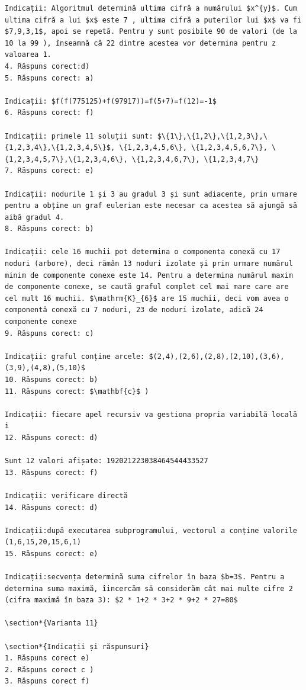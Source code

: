 \documentclass[10pt]{article}
\begin{document}
\begin{verbatim}
Indicații: Algoritmul determină ultima cifră a numărului $x^{y}$. Cum ultima cifră a lui $x$ este 7 , ultima cifră a puterilor lui $x$ va fi $7,9,3,1$, apoi se repetă. Pentru y sunt posibile 90 de valori (de la 10 la 99 ), înseamnă că 22 dintre acestea vor determina pentru z valoarea 1.
4. Răspuns corect:d)
5. Răspuns corect: a)

Indicații: $f(f(775125)+f(97917))=f(5+7)=f(12)=-1$
6. Răspuns corect: f)

Indicații: primele 11 soluții sunt: $\{1\},\{1,2\},\{1,2,3\},\{1,2,3,4\},\{1,2,3,4,5\}$, \{1,2,3,4,5,6\}, \{1,2,3,4,5,6,7\}, \{1,2,3,4,5,7\},\{1,2,3,4,6\}, \{1,2,3,4,6,7\}, \{1,2,3,4,7\}
7. Răspuns corect: e)

Indicații: nodurile 1 și 3 au gradul 3 și sunt adiacente, prin urmare pentru a obține un graf eulerian este necesar ca acestea să ajungă să aibă gradul 4.
8. Răspuns corect: b)

Indicații: cele 16 muchii pot determina o componenta conexă cu 17 noduri (arbore), deci rămân 13 noduri izolate și prin urmare numărul minim de componente conexe este 14. Pentru a determina numărul maxim de componente conexe, se caută graful complet cel mai mare care are cel mult 16 muchii. $\mathrm{K}_{6}$ are 15 muchii, deci vom avea o componentă conexă cu 7 noduri, 23 de noduri izolate, adică 24 componente conexe
9. Răspuns corect: c)

Indicații: graful conține arcele: $(2,4),(2,6),(2,8),(2,10),(3,6),(3,9),(4,8),(5,10)$
10. Răspuns corect: b)
11. Răspuns corect: $\mathbf{c}$ )

Indicații: fiecare apel recursiv va gestiona propria variabilă locală i
12. Răspuns corect: d)

Sunt 12 valori afișate: 192021223038464544433527
13. Răspuns corect: f)

Indicații: verificare directă
14. Răspuns corect: d)

Indicații:după executarea subprogramului, vectorul a conține valorile (1,6,15,20,15,6,1)
15. Răspuns corect: e)

Indicații:secvența determină suma cifrelor în baza $b=3$. Pentru a determina suma maximă, îincercăm să considerăm cât mai multe cifre 2 (cifra maximă în baza 3): $2 * 1+2 * 3+2 * 9+2 * 27=80$

\section*{Varianta 11}

\section*{Indicații și răspunsuri}
1. Răspuns corect e)
2. Răspuns corect c )
3. Răspuns corect f)


\end{verbatim}
\end{document}
